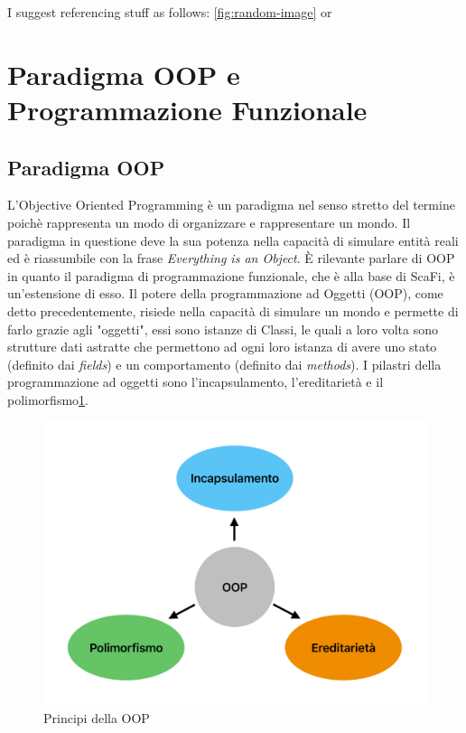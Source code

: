 \documentclass[12pt,a4paper,openright,twoside]{book}
\begin{document}
I suggest referencing stuff as follows: \cref{fig:random-image} or 


\section{Paradigma OOP e Programmazione Funzionale}

\subsection{Paradigma OOP}

L'Objective Oriented Programming è un paradigma nel senso stretto del termine poichè rappresenta un modo di organizzare e rappresentare un mondo. 
Il paradigma in questione deve la sua potenza nella capacità di simulare entità reali ed è riassumbile con la frase \textit{Everything is an Object}. 
È rilevante parlare di OOP in quanto il paradigma di programmazione funzionale, che è alla base di ScaFi, è un'estensione di esso. 
Il potere della programmazione ad Oggetti (OOP), come detto precedentemente, risiede nella capacità di simulare un mondo e permette di farlo grazie agli "oggetti", essi sono istanze di Classi, le quali a loro volta sono strutture dati astratte che permettono ad ogni loro istanza di avere uno stato (definito dai \textit{fields}) e un comportamento (definito dai \textit{methods}).
I pilastri della programmazione ad oggetti sono l'incapsulamento, l'ereditarietà e il polimorfismo\cref{fig:OOP}.

\begin{figure}
    \centering
    \includegraphics[width=.6\linewidth]{figures/OOP.pdf}
    \caption{Principi della OOP}
    \label{fig:OOP}
\end{figure}
\end{document}
